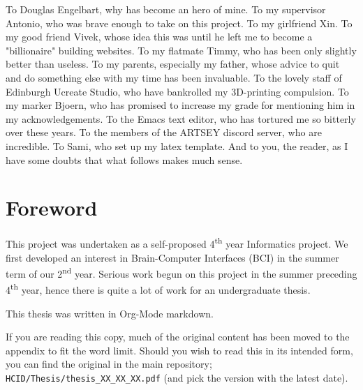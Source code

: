 \documentclass[logo,bsc,singlespacing,parskip]{infthesis}
\begin{document}
\begin{preliminary}
\begin{acknowledgements}
To Douglas Engelbart, why has become an hero of mine.
To my supervisor Antonio, who was brave enough to take on this project.
To my girlfriend Xin.
To my good friend Vivek, whose idea this was until he left me to become a "billionaire" building websites.
To my flatmate Timmy, who has been only slightly better than useless.
To my parents, especially my father, whose advice to quit and do something else with my time has been invaluable.
To the lovely staff of Edinburgh Ucreate Studio, who have bankrolled my 3D-printing compulsion.
To my marker Bjoern, who has promised to increase my grade for mentioning him in my acknowledgements.
To the Emacs text editor, who has tortured me so bitterly over these years.
To the members of the ARTSEY discord server, who are incredible.
To Sami, who set up my latex template.
And to you, the reader, as I have some doubts that what follows makes much sense.
\end{acknowledgements}

\iffalse %
\part{Foreword}
\label{sec:org85bc48a}
\fi
\chapter*{Foreword}
\label{sec:org111f0b4}
This project was undertaken as a self-proposed 4\textsuperscript{th} year Informatics project.
We first developed an interest in Brain-Computer Interfaces (BCI) in the summer term of our 2\textsuperscript{nd} year.
Serious work begun on this project in the summer preceding 4\textsuperscript{th} year, hence there is quite a lot of work for an undergraduate thesis.

This thesis was written in Org-Mode markdown.

If you are reading this copy, much of the original content has been moved to the appendix to fit the word limit.
Should you wish to read this in its intended form, you can find the original in the main repository; \texttt{HCID/Thesis/thesis\_XX\_XX\_XX.pdf} (and pick the version with the latest date).

\setcounter{tocdepth}{1}
\tableofcontents
{}
\listoffigures
\listoftables
\end{preliminary}

\iffalse
\end{document}
